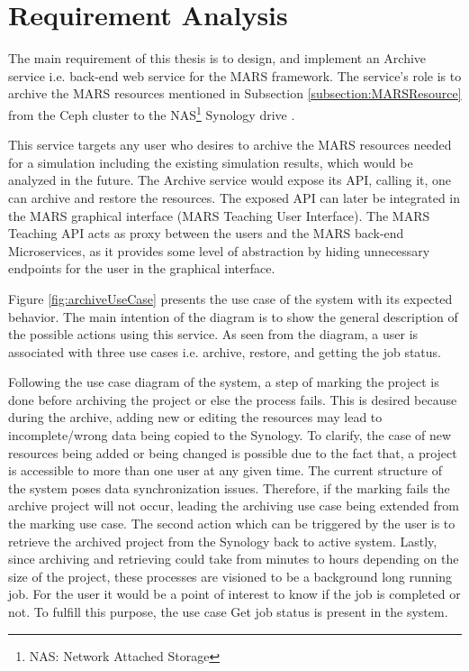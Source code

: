 \newpage
\chapter{Requirement Analysis}
\label{chap:ReqAnalysis}
 The main requirement of this thesis is to design, and implement an Archive service i.e. back-end web service for the MARS framework. The service's role is to
 archive the MARS resources mentioned in Subsection \ref{subsection:MARSResource} from the Ceph cluster \cite{Ceph} to the 
 NAS\footnote{NAS: Network Attached Storage} Synology drive \cite{Synology}.

 This service targets any user who desires to archive the MARS resources needed for a simulation including the existing simulation results, which would
 be analyzed in the future. The Archive service would expose its API, calling it, one can archive and restore the resources. The exposed
 API can later be integrated in the MARS graphical interface (MARS Teaching User Interface). The MARS Teaching API acts as proxy between the users 
 and the MARS back-end Microservices, as it provides some level of abstraction by hiding unnecessary endpoints for the user in the graphical interface.

 Figure \ref{fig:archiveUseCase} presents the use case of the system with its expected behavior. The main intention of the diagram is to show the
 general description of the possible actions using this service. As seen from the diagram, a user is associated with three use cases i.e. archive, restore,
 and getting the job status. 

 Following the use case diagram of the system, a step of marking the project is done before archiving the project or else the process fails. This is desired because 
 during the archive, adding new or editing the resources may lead to incomplete/wrong data being copied to the Synology. To clarify, the case of new resources being
 added or being changed is possible due to the fact that, a project is accessible to more than one user at any given time. The current structure of the system
 poses data synchronization issues. Therefore, if the marking fails the archive project will not occur, leading the archiving use case being extended from the marking
 use case. The second action which can be triggered by the user is to retrieve the archived project from the Synology back to active system. Lastly, since archiving 
 and retrieving could take from minutes to hours depending on the size of the project, these processes are visioned to be a background long running job. For the user
 it would be a point of interest to know if the job is completed or not. To fulfill this purpose, the use case Get job status is present in the system.
 
